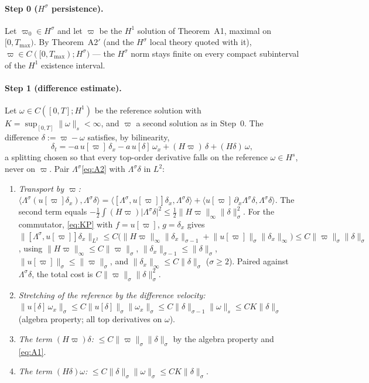 \documentclass[11pt,a4paper]{article}
\theoremstyle{plain}
\theoremstyle{definition}
\theoremstyle{plain}
\newcommand{\nrm}[1]{\lVert #1 \rVert}
\newcommand{\abs}[1]{\lvert #1 \rvert}
\begin{document}
\paragraph{Step 0 ($H^\sigma$ persistence).} Let $\varpi_0\in H^\sigma$ and let $\varpi$ be the $H^1$ solution of Theorem~A1, maximal on $[0,T_{\max})$. By Theorem~A2$'$ (and the $H^\sigma$ local theory quoted with it), $\varpi\in C([0,T_{\max});H^\sigma)$ --- the $H^\sigma$ norm stays finite on every compact subinterval of the $H^1$ existence interval.

\paragraph{Step 1 (difference estimate).} Let $\omega\in C([0,T];H^1)$ be the reference solution with $K=\sup_{[0,T]}\nrm{\omega}_s<\infty$, and $\varpi$ a second solution as in Step~0. The difference $\delta:=\varpi-\omega$ satisfies, by bilinearity,
\begin{equation}\label{eq:A2}
\delta_t=-a\,u[\varpi]\,\delta_x-a\,u[\delta]\,\omega_x+(H\varpi)\,\delta+(H\delta)\,\omega,
\end{equation}
a splitting chosen so that every top-order derivative falls on the reference $\omega\in H^s$, never on $\varpi$. Pair $\Lambda^\sigma$\eqref{eq:A2} with $\Lambda^\sigma\delta$ in $L^2$:
\begin{enumerate}[leftmargin=2em]
\item \emph{Transport by $\varpi$:} $\langle\Lambda^\sigma(u[\varpi]\delta_x),\Lambda^\sigma\delta\rangle=\langle[\Lambda^\sigma,u[\varpi]]\delta_x,\Lambda^\sigma\delta\rangle+\langle u[\varpi]\,\partial_x\Lambda^\sigma\delta,\Lambda^\sigma\delta\rangle$. The second term equals $-\tfrac12\int(H\varpi)\abs{\Lambda^\sigma\delta}^2\le\tfrac12\nrm{H\varpi}_\infty\nrm{\delta}_\sigma^2$. For the commutator, \eqref{eq:KP} with $f=u[\varpi]$, $g=\delta_x$ gives $\nrm{[\Lambda^\sigma,u[\varpi]]\delta_x}_{L^2}\le C\big(\nrm{H\varpi}_\infty\nrm{\delta_x}_{\sigma-1}+\nrm{u[\varpi]}_\sigma\nrm{\delta_x}_\infty\big)\le C\nrm{\varpi}_\sigma\nrm{\delta}_\sigma$, using $\nrm{H\varpi}_\infty\le C\nrm{\varpi}_\sigma$, $\nrm{\delta_x}_{\sigma-1}\le\nrm{\delta}_\sigma$, $\nrm{u[\varpi]}_\sigma\le\nrm{\varpi}_\sigma$, and $\nrm{\delta_x}_\infty\le C\nrm{\delta}_\sigma$ ($\sigma\ge2$). Paired against $\Lambda^\sigma\delta$, the total cost is $C\nrm{\varpi}_\sigma\nrm{\delta}_\sigma^2$.
\item \emph{Stretching of the reference by the difference velocity:} $\nrm{u[\delta]\,\omega_x}_\sigma\le C\nrm{u[\delta]}_\sigma\nrm{\omega_x}_\sigma\le C\nrm{\delta}_{\sigma-1}\nrm{\omega}_s\le CK\nrm{\delta}_\sigma$ (algebra property; all top derivatives on $\omega$).
\item \emph{The term $(H\varpi)\delta$:} $\le C\nrm{\varpi}_\sigma\nrm{\delta}_\sigma$ by the algebra property and \eqref{eq:A1}.
\item \emph{The term $(H\delta)\omega$:} $\le C\nrm{\delta}_\sigma\nrm{\omega}_\sigma\le CK\nrm{\delta}_\sigma$.
\end{enumerate}
\end{document}
